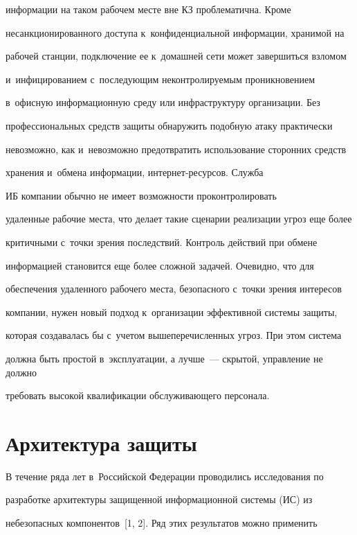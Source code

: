 {информации на таком рабочем месте вне КЗ проблематична. Кроме 


несанкционированного доступа к~конфиденциальной информации, хранимой на 


рабочей станции, подключение ее к~домашней сети может завершиться взломом 


и~инфицированием с~последующим неконтролируемым проникновением 


в~офисную информационную среду или инфраструктуру организации. Без 


профессиональных средств защиты обнаружить подобную атаку практически 


невозможно, как и~невозможно предотвратить использование сторонних средств 


хранения и~обмена информации, ин\-тер\-нет-ре\-сур\-сов. Служба 


ИБ компании обычно не имеет возможности проконтролировать 


удаленные рабочие места, что делает такие сценарии реализации угроз еще более 


критичными с~точки зрения последствий. Контроль действий при обмене 


информацией становится еще более сложной задачей. Очевидно, что для 


обеспечения удаленного рабочего места, безопасного с~точки зрения интересов 


компании, нужен новый подход к~организации эффективной системы защиты, 


которая создавалась бы с~учетом вышеперечисленных угроз. При этом система 


должна быть простой в~эксплуатации, а лучше~--- скрытой, управление не должно 


требовать высокой квалификации обслуживающего персонала.


  


  \section{Архитектура защиты }


  


  В течение ряда лет в~Российской Федерации проводились исследования по 


разработке архитектуры защищенной информационной системы (ИС) из 


не\-безопас\-ных компонентов~[1, 2]. Ряд этих результатов можно применить 


}
